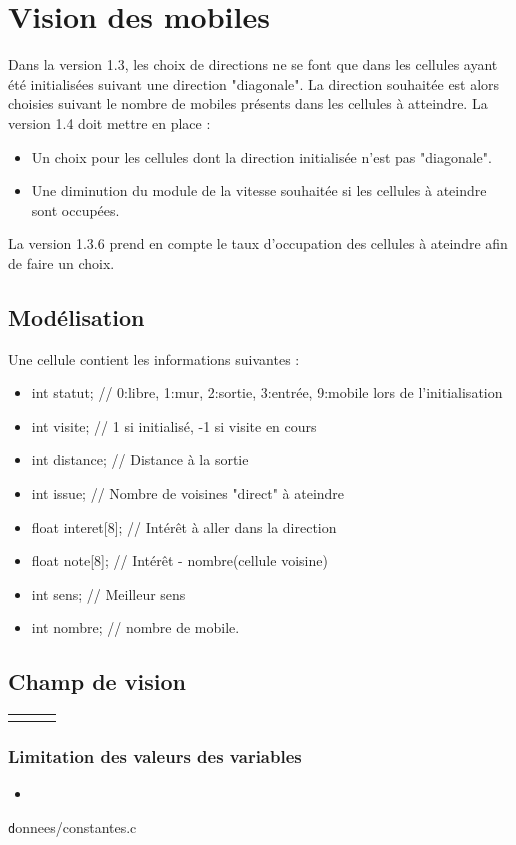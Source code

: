 %
\section{Vision des mobiles}
%
Dans la version 1.3, les choix de directions ne se font que dans les cellules ayant été initialisées suivant une direction "diagonale". La direction souhaitée est alors choisies suivant le nombre de mobiles présents dans les cellules à atteindre.
La version 1.4 doit mettre en place :
\begin{itemize}[leftmargin=2cm]
\item Un choix pour les cellules dont la direction initialisée n'est pas "diagonale".
\item Une diminution du module de la vitesse souhaitée si les cellules à ateindre sont occupées.
\end{itemize}
%
La version 1.3.6 prend en compte le taux d'occupation des cellules à ateindre afin de faire un choix.
%
\subsection{Modélisation}
%
Une cellule contient les informations suivantes :
\begin{itemize}[leftmargin=2cm]
\item int statut;		// 0:libre, 1:mur, 2:sortie, 3:entrée, 9:mobile lors de l'initialisation
\item int visite;		// 1 si initialisé, -1 si visite en cours
\item int distance;		// Distance à la sortie
\item int issue;		// Nombre de voisines "direct" à ateindre
\item float interet[8];		// Intérêt à aller dans la direction
\item float note[8];		// Intérêt - nombre(cellule voisine)
\item int sens;			// Meilleur sens
\item int nombre;		// nombre de mobile.
\end{itemize}
%
\subsection{Champ de vision}
%
\begin{center}
	\begin{tabular}{rcl}
	 & \\
	\end{tabular}
\end{center}
%
%
%
\subsubsection{Limitation des valeurs des variables}
%

\begin{itemize}[label=, leftmargin=2cm]
\item 
\end{itemize}
%
{\texttt donnees/constantes.c}
%
